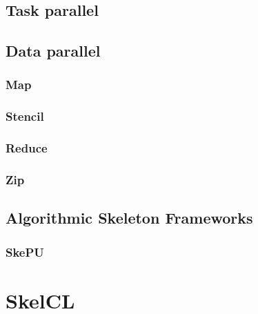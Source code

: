 
\subsection{Task parallel}

\subsection{Data parallel}

\subsubsection{Map}

\subsubsection{Stencil}

\subsubsection{Reduce}

\subsubsection{Zip}

\subsection{Algorithmic Skeleton Frameworks}



\subsubsection{SkePU}


\section{SkelCL}

